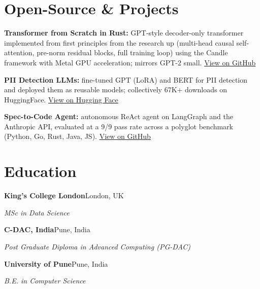 \documentclass[10pt,a4paper]{article}
\begin{document}
\section{Open-Source \& Projects}
\begin{tight}
  \item \textbf{Transformer from Scratch in Rust:} GPT-style decoder-only transformer implemented from first principles from the research up (multi-head causal self-attention, pre-norm residual blocks, full training loop) using the Candle framework with Metal GPU acceleration; mirrors GPT-2 small. \href{https://github.com/abhijeetscode/transformer-rust}{View on GitHub}
  \item \textbf{PII Detection LLMs:} fine-tuned GPT (LoRA) and BERT for PII detection and deployed them as reusable models; collectively 67K+ downloads on HuggingFace. \href{https://huggingface.co/ab-ai/pii_model}{View on Hugging Face}
  \item \textbf{Spec-to-Code Agent:} autonomous ReAct agent on LangGraph and the Anthropic API, evaluated at a 9/9 pass rate across a polyglot benchmark (Python, Go, Rust, Java, JS). \href{https://github.com/abhijeetscode/Spec-to-Code-Agent}{View on GitHub}
\end{tight}

\section{Education}
{\color{company}\bfseries King's College London}\hfill {\color{muted}London, UK}\par
{\itshape MSc in Data Science}\par\vspace{2pt}
{\color{company}\bfseries C-DAC, India}\hfill {\color{muted}Pune, India}\par
{\itshape Post Graduate Diploma in Advanced Computing (PG-DAC)}\par\vspace{2pt}
{\color{company}\bfseries University of Pune}\hfill {\color{muted}Pune, India}\par
{\itshape B.E. in Computer Science}\par
\end{document}
